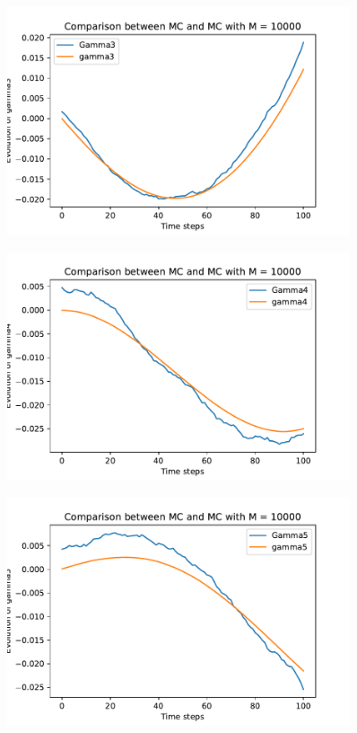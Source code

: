 \documentclass[a4paper,11pt,openright]{report}
\begin{document}
\begin{figure}[H]
\centering
\includegraphics[width=0.9\textwidth]{gamma3 MC = 10000.pdf}
\end{figure}
\begin{figure}[H]
\centering
\includegraphics[width=0.9\textwidth]{gamma4 MC = 10000.pdf}
\end{figure}
\begin{figure}[H]
\centering
\includegraphics[width=0.9\textwidth]{gamma5 MC = 10000.pdf}
\end{figure}
\newpage
\end{document}
